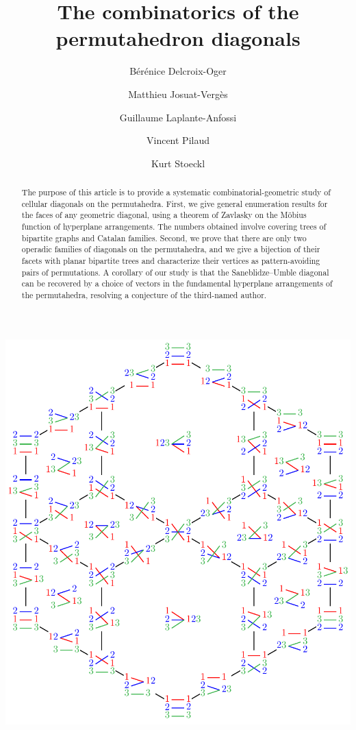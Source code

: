 \documentclass{amsart}
\title{The combinatorics of the permutahedron diagonals}
\author[B. Delcroix-Oger]{B\'er\'enice Delcroix-Oger}
\author[M. Josuat-Verg\`es]{Matthieu Josuat-Verg\`es}
\author[G. Laplante-Anfossi]{Guillaume Laplante-Anfossi}
\author[V. Pilaud]{Vincent Pilaud}
\author[K. Stoeckl]{Kurt Stoeckl}
\theoremstyle{definition}
\begin{document}
\begin{abstract}
The purpose of this article is to provide a systematic combinatorial-geometric study of cellular diagonals on the permutahedra. 
First, we give general enumeration results for the faces of any geometric diagonal, using a theorem of Zavlasky on the M\"obius function of hyperplane arrangements.
The numbers obtained involve covering trees of bipartite graphs and Catalan families. 
Second, we prove that there are only two operadic families of diagonals on the permutahedra, and we give a bijection of their facets with planar bipartite trees and characterize their vertices as pattern-avoiding pairs of permutations.
A corollary of our study is that the Saneblidze--Umble diagonal can be recovered by a choice of vectors in the fundamental hyperplane arrangements of the permutahedra, resolving a conjecture of the third-named author.  
\end{abstract}

\vspace*{.1cm}
\maketitle

\centerline{\includegraphics[scale=.9]{diagonalPermutahedron3}}
\end{document}
